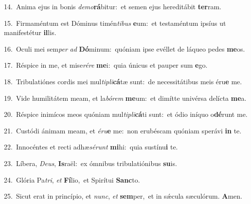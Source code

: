 {\numbfont\textcolor{\numbcolor}{14.}}~Anima ejus in bonis \textit{de}\-\textit{mo}\textbf{rá}bitur:~\star et semen ejus hereditábit \textbf{ter}\-ram.\par
{\numbfont\textcolor{\numbcolor}{15.}}~Firmaméntum est Dóminus timén\-\textit{ti}\-\textit{bus} \textbf{e}\-um:~\star et testaméntum ipsíus ut manifestétur \textbf{il}\-lis.\par
{\numbfont\textcolor{\numbcolor}{16.}}~Oculi mei sem\textit{per} \textit{ad} \textbf{Dó}\-minum:~\star quóniam ipse evéllet de láqueo pedes \textbf{me}\-os.\par
{\numbfont\textcolor{\numbcolor}{17.}}~Réspice in me, et mise\-\textit{ré}\-\textit{re} \textbf{me}\-i:~\star quia únicus et pauper sum \textbf{e}\-go.\par
{\numbfont\textcolor{\numbcolor}{18.}}~Tribulatiónes cordis mei mul\-\textit{ti}\-\textit{pli}\textbf{cá}tæ sunt:~\star de necessitátibus meis éru\textbf{e} me.\par
{\numbfont\textcolor{\numbcolor}{19.}}~Vide humilitátem meam, et la\-\textit{bó}\-\textit{rem} \textbf{me}\-um:~\star et dimítte univérsa delícta \textbf{me}\-a.\par
{\numbfont\textcolor{\numbcolor}{20.}}~Réspice inimícos meos quóniam mul\-\textit{ti}\-\textit{pli}\textbf{cá}ti sunt:~\star et ódio iníquo o\-\textbf{dé}\-runt me.\par
{\numbfont\textcolor{\numbcolor}{21.}}~Custódi ánimam meam, et \textit{é}\-\textit{ru}\textbf{e} me:~\star non erubéscam quóniam sperávi \textbf{in} te.\par
{\numbfont\textcolor{\numbcolor}{22.}}~Innocéntes et recti adhæ\-\textit{sé}\-\textit{runt} \textbf{mi}\-hi:~\star quia sustínu\textbf{i} te.\par
{\numbfont\textcolor{\numbcolor}{23.}}~Líbera, \textit{De}\-\textit{us}, \textbf{Is}\-raël:~\star ex ómnibus tribulatiónibus \textbf{su}\-is.\par
{\numbfont\textcolor{\numbcolor}{24.}}~Glória Pa\-\textit{tri}\-, \textit{et} \textbf{Fí}\-lio,~\star et Spirítui \textbf{Sanc}\-to.\par
{\numbfont\textcolor{\numbcolor}{25.}}~Sicut erat in princípio, et \textit{nunc}\-, \textit{et} \textbf{sem}\-per,~\star et in sǽcula sæculórum. \textbf{A}\-men.\par
